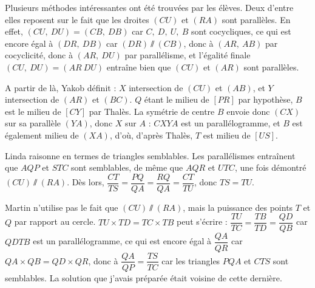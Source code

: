 \begin{center}

\end{center}

\begin{sol}

\medskip

Plusieurs méthodes intéressantes ont été trouvées par les élèves. Deux d'entre elles reposent sur le fait que les droites $(CU)$ et $(RA)$ sont parallèles. En effet, $(CU, \ DU) = (CB, \ DB)$ car $C, \ D, \ U, \ B$ sont cocycliques, ce qui est encore égal à $(DR, \ DB)$ car $(DR) \sslash (CB)$, donc à $(AR, \ AB)$ par cocyclicité, donc à $(AR, \ DU)$ par parallélisme, et l'égalité finale $(CU, \ DU) = (AR \ DU)$ entraîne bien que $(CU)$ et $(AR)$ sont parallèles. 

A partir de là, Yakob définit : $X$ intersection de $(CU)$ et $(AB)$, et $Y$ intersection de $(AR)$ et $(BC)$. $Q$ étant le milieu de $[PR]$ par hypothèse, $B$ est le milieu de $[CY]$ par Thalès. La symétrie de centre $B$ envoie donc $(CX)$ sur sa parallèle $(YA)$, donc $X$ sur $A$ : $CXYA$ est un parallélogramme, et $B$ est également milieu de $(XA)$, d'où, d'après Thalès, $T$ est milieu de $[US]$.

Linda raisonne en termes de triangles semblables. Les parallélismes entraînent que $AQP$ et $STC$ sont semblables, de même que $AQR$ et $UTC$, une fois démontré $(CU) \sslash (RA)$. Dès lors, $\dfrac{CT}{TS} = \dfrac{PQ}{QA} = \dfrac{RQ}{QA} = \dfrac{CT}{TU}$, donc $TS = TU$.

Martin n'utilise pas le fait que $(CU) \sslash (RA)$, mais la puissance des points $T$ et $Q$ par rapport au cercle. $TU \times TD = TC \times TB$ peut s'écrire : $\dfrac{TU}{TC} = \dfrac{TB}{TD} = \dfrac{QD}{QB}$ car $QDTB$ est un parallélogramme, ce qui est encore égal à $\dfrac{QA}{QR}$ car $QA \times QB = QD \times QR$, donc à $\dfrac{QA}{QP} = \dfrac{TS}{TC}$ car les triangles $PQA$ et $CTS$ sont semblables. La solution que j'avais préparée était voisine de cette dernière.

\end{sol}


